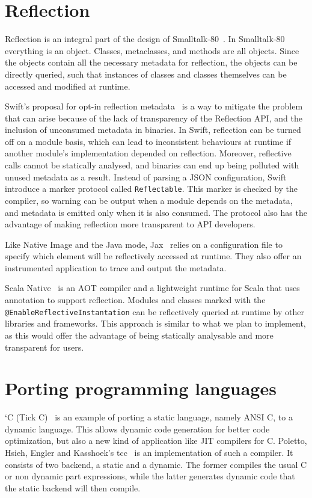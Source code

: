 \section{Reflection}
Reflection is an integral part of the design of Smalltalk-80~\cite{goldberg_smalltalk-80_1983}. In Smalltalk-80 everything is an object. Classes, metaclasses, and methods are all objects. Since the objects contain all the necessary metadata for reflection, the objects can be directly queried, such that instances of classes and classes themselves can be accessed and modified at runtime. 

Swift's proposal for opt-in reflection metadata~\cite{noauthor_pitch_2022} is a way to mitigate the problem that can arise because of the lack of transparency of the Reflection API, and the inclusion of unconsumed metadata in binaries. In Swift, reflection can be turned off on a module basis, which can lead to inconsistent behaviours at runtime if another module's implementation depended on reflection. Moreover, reflective calls cannot be statically analysed, and binaries can end up being polluted with unused metadata as a result. Instead of parsing a JSON configuration, Swift introduce a marker protocol called \verb|Reflectable|. This marker is checked by the compiler, so warning can be output when a module depends on the metadata, and metadata is emitted only when it is also consumed. The protocol also has the advantage of making reflection more transparent to API developers.

Like Native Image and the Java mode, Jax~\cite{tip_practical_1999} relies on a configuration file to specify which element will be reflectively accessed at runtime. They also offer an instrumented application to trace and output the metadata.

Scala Native~\cite{noauthor_scala_nodate} is an AOT compiler and a lightweight runtime for Scala that uses annotation to support reflection. Modules and classes marked with the \verb|@EnableReflectiveInstantation| can be reflectively queried at runtime by other libraries and frameworks.
This approach is similar to what we plan to implement, as this would offer the advantage of being statically analysable and more transparent for users.

\section{Porting programming languages}
`C (Tick C)~\cite{engler_c_1996} is an example of porting a static language, namely ANSI C, to a dynamic language. This allows dynamic code generation for better code optimization, but also a new kind of application like JIT compilers for C. Poletto, Hsieh, Engler and Kasshoek's tcc~\cite{poletto_c_1999} is an implementation of such a compiler. It consists of two backend, a static and a dynamic.
The former compiles the usual C or non dynamic part expressions, while the latter generates dynamic code that the static backend will then compile.

